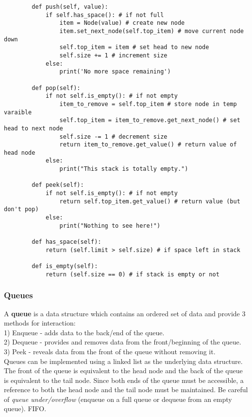 \documentclass[11pt, a4paper]{article}
\begin{document}
\begin{spacing}{1.1}
\begin{lstlisting}
		def push(self, value):
			if self.has_space(): # if not full
				item = Node(value) # create new node
				item.set_next_node(self.top_item) # move current node down
				self.top_item = item # set head to new node
				self.size += 1 # increment size
			else:
				print('No more space remaining')
		
		def pop(self):
			if not self.is_empty(): # if not empty
				item_to_remove = self.top_item # store node in temp varaible
				self.top_item = item_to_remove.get_next_node() # set head to next node
				self.size -= 1 # decrement size
				return item_to_remove.get_value() # return value of head node
			else:
				print("This stack is totally empty.")
		
		def peek(self):
			if not self.is_empty(): # if not empty
				return self.top_item.get_value() # return value (but don't pop)
			else:
				print("Nothing to see here!")
		
		def has_space(self):
			return (self.limit > self.size) # if space left in stack
		
		def is_empty(self):
			return (self.size == 0) # if stack is empty or not	\end{lstlisting}\vspace*{2mm}
	\subsubsection{Queues}
	A \textbf{queue} is a data structure which contains an ordered set of data and provide 3 methods for interaction: \\
	\hspace*{3mm} 1) Enqueue - adds data to the back/end of the queue. \\
	\hspace*{3mm} 2) Dequeue - provides and removes data from the front/beginning of the queue. \\
	\hspace*{3mm} 3) Peek - reveals data from the front of the queue without removing it. \vspace*{1mm} \\
	Queues can be implemented using a linked list as the underlying data structure. The front of the queue is equivalent to the head node and the back of the queue is equivalent to the tail node. Since both ends of the queue must be accessible, a reference to both the head node and the tail node must be maintained. Be careful of \textit{queue under/overflow} (enqueue on a full queue or dequeue from an empty queue). FIFO. \newpage


\end{spacing}
\end{document}
